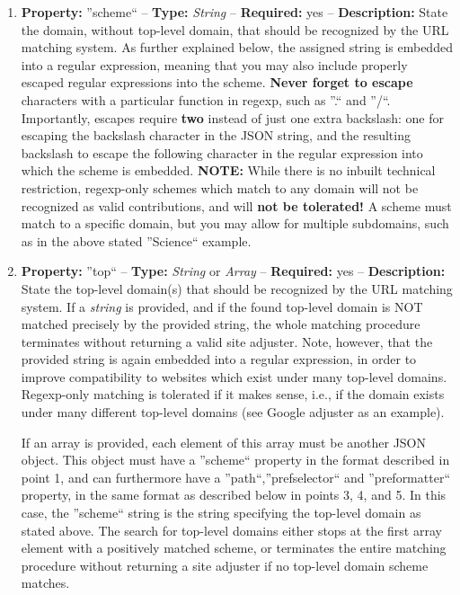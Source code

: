 \documentclass[
a4paper,
12pt,
]
{article}
\begin{document}
 \begin{enumerate}
  \item \textbf{Property:} ''scheme`` -- \textbf{Type:} \textit{String} -- \textbf{Required:} yes -- \textbf{Description:} State the domain, without top-level domain, that should be recognized by the URL matching system. As further explained below, the assigned string is embedded into a regular expression, meaning that you may also include properly escaped regular expressions into the scheme. \textbf{Never forget to escape} characters with a particular function in regexp, such as ''.`` and ''/``. 
  Importantly, escapes require \textbf{two} instead of just one extra backslash: one for escaping the backslash character in the JSON string, and the resulting backslash to escape the following character in the regular expression into which the scheme is embedded.
  \textbf{NOTE:} While there is no inbuilt technical restriction, regexp-only schemes which match to any domain will not be recognized as valid contributions, and will \textbf{not be tolerated!} 
  A scheme must match to a specific domain, but you may allow for multiple subdomains, such as in the above stated ''Science`` example.
  
  \item \textbf{Property:} ''top`` -- \textbf{Type:} \textit{String} or \textit{Array} -- \textbf{Required:} yes -- \textbf{Description:} State the top-level domain(s) that should be recognized by the URL matching system. If a \textit{string} is provided, and if the found top-level domain is NOT matched precisely by the provided string, the whole matching procedure terminates without returning a valid site adjuster. Note, however, that the provided string is again embedded into a regular expression, in order to improve compatibility to websites which exist under many top-level domains. 
  Regexp-only matching is tolerated if it makes sense, i.e., if the domain exists under many different top-level domains (see Google adjuster as an example).\par
  
  If an array is provided, each element of this array must be another JSON object. This object must have a ''scheme`` property in the format described in point 1, and can furthermore have a ''path``,''prefselector`` and ''preformatter`` property, in the same format as described below in points 3, 4, and 5. In this case, the ''scheme`` string is the string specifying the top-level domain as stated above. 
  The search for top-level domains either stops at the first array element with a positively matched scheme, or terminates the entire matching procedure without returning a site adjuster if no top-level domain scheme matches.\par
  

\end{enumerate}
\end{document}
